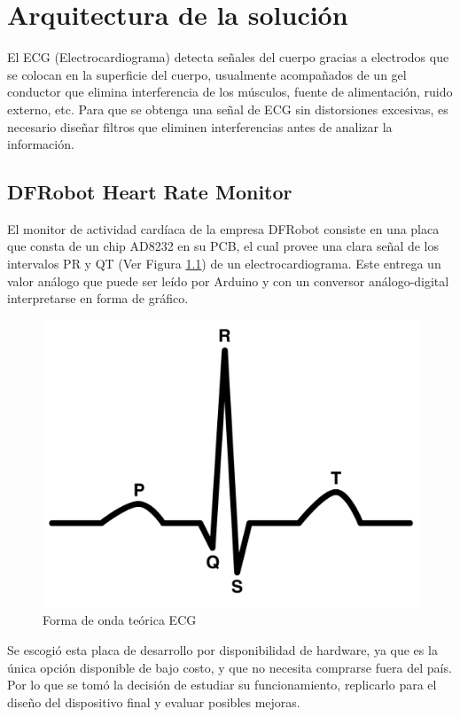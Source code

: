 \chapter{Arquitectura de la solución}\label{arquitectura}
El ECG (Electrocardiograma) detecta señales del cuerpo gracias a electrodos que se colocan en la superficie del cuerpo, usualmente acompañados de un gel conductor que elimina interferencia de los músculos, fuente de alimentación,  ruido externo, etc. Para que se obtenga una señal de ECG sin distorsiones excesivas, es necesario diseñar filtros que eliminen interferencias antes de analizar la información. \\

\section{DFRobot Heart Rate Monitor}\label{reqfuncional1asc}
El monitor de actividad cardíaca de la empresa DFRobot consiste en una placa que consta de un chip AD8232 en su PCB, el cual provee una clara señal de los intervalos PR y QT (Ver Figura \ref{onda})  de un electrocardiograma. Este entrega un valor análogo que puede ser leído por Arduino y con un conversor análogo-digital interpretarse en forma de gráfico.\\

\begin{figure}[H]
\centering
\includegraphics[scale=0.2]{figuras/ecg/senal.png}
\caption{Forma de onda teórica ECG}
\label{onda}
\end{figure}

Se escogió esta placa de desarrollo por disponibilidad de hardware, ya que es la única opción disponible de bajo costo, y que no necesita comprarse fuera del país. Por lo que se tomó la decisión de estudiar su funcionamiento, replicarlo para el diseño del dispositivo final y evaluar posibles mejoras. \\

